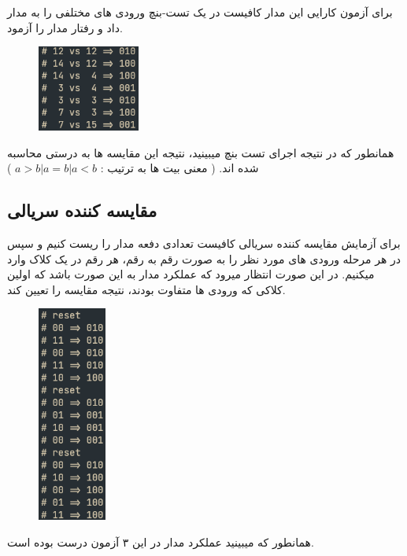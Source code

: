 \documentclass{article}
\begin{document}
برای آزمون کارایی این مدار کافیست در یک تست-بنچ ورودی های مختلفی را به مدار داد
و رفتار مدار را آزمود.

\begin{figure}[H]
    \centering
    \includegraphics[width=0.3\textwidth]{./test_res.png}
\end{figure}

همانطور که در نتیجه اجرای تست بنچ میبینید، نتیجه این مقایسه ها به درستی محاسبه شده اند.
(
معنی بیت ها به ترتیب : 
$a > b | a = b | a < b$
)

\subsection{مقایسه کننده سریالی}
برای آزمایش مقایسه کننده سریالی کافیست تعدادی دفعه مدار را ریست کنیم و
سپس در هر مرحله ورودی های مورد نظر را به صورت رقم به رقم، هر رقم در یک کلاک وارد میکنیم.
در این صورت انتظار میرود که عملکرد مدار به این صورت باشد که اولین کلاکی که 
ورودی ها متفاوت بودند، نتیجه مقایسه را تعیین کند.

\begin{figure}[H]
    \centering
    \includegraphics[width=0.2\textwidth]{./serial_test_res.png}
\end{figure}

همانطور که میبینید عملکرد مدار در این ۳ آزمون درست بوده است.
\end{document}
